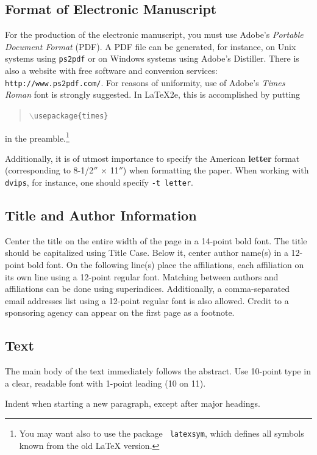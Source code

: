 \documentclass{article}
\begin{document}
\subsection{Format of Electronic Manuscript}

For the production of the electronic manuscript, you must use Adobe's
{\em Portable Document Format} (PDF). A PDF file can be generated, for
instance, on Unix systems using {\tt ps2pdf} or on Windows systems
using Adobe's Distiller. There is also a website with free software
and conversion services: {\tt http://www.ps2pdf.com/}. For reasons of
uniformity, use of Adobe's {\em Times Roman} font is strongly suggested. In
\LaTeX2e{}, this is accomplished by putting
\begin{quote} 
\mbox{\tt $\backslash$usepackage\{times\}}
\end{quote}
in the preamble.\footnote{You may want also to use the package {\tt
latexsym}, which defines all symbols known from the old \LaTeX{}
version.}
  
Additionally, it is of utmost importance to specify the American {\bf
letter} format (corresponding to 8-1/2$''$ $\times$ 11$''$) when
formatting the paper. When working with {\tt dvips}, for instance, one
should specify {\tt -t letter}.

\subsection{Title and Author Information}

Center the title on the entire width of the page in a 14-point bold
font. The title should be capitalized using Title Case. Below it, center author name(s) in a 12-point bold font. On the following line(s) place the affiliations, each affiliation on its own line using a 12-point regular font. Matching between authors and affiliations can be done using superindices. Additionally, a comma-separated email addresses list using a 12-point regular font is also allowed. Credit to a
sponsoring agency can appear on the first page as a footnote.

\subsection{Text}

The main body of the text immediately follows the abstract. Use
10-point type in a clear, readable font with 1-point leading (10 on
11).

Indent when starting a new paragraph, except after major headings.
\end{document}
